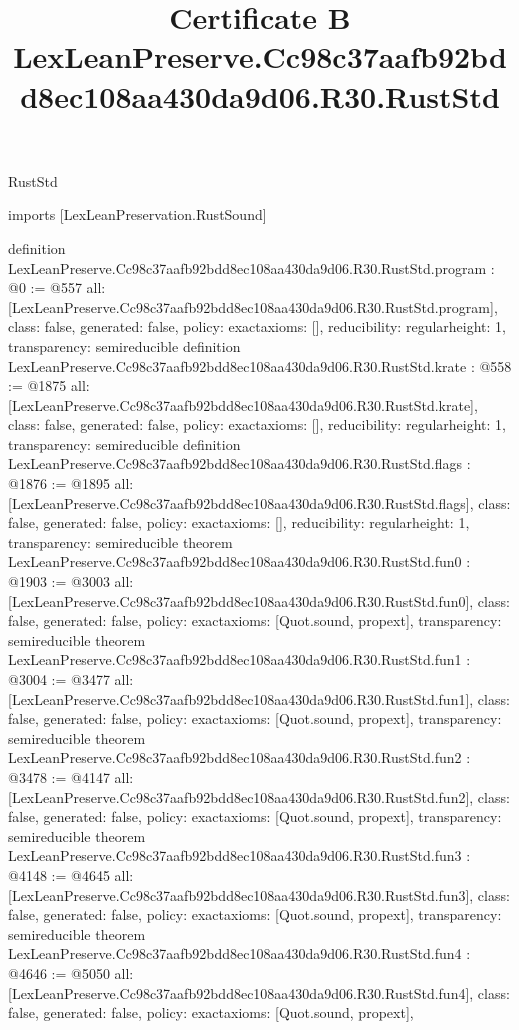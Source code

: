 \begin{lexlean}{RustStd}
\title{Certificate B LexLeanPreserve.Cc98c37aafb92bdd8ec108aa430da9d06.R30.RustStd}
\begin{coremodule}
imports [LexLeanPreservation.RustSound]

definition LexLeanPreserve.Cc98c37aafb92bdd8ec108aa430da9d06.R30.RustStd.program : @0 := @557 {
  all: [LexLeanPreserve.Cc98c37aafb92bdd8ec108aa430da9d06.R30.RustStd.program],
  class: false,
  generated: false,
  policy: exact{axioms: []},
  reducibility: regular{height: 1},
  transparency: semireducible
}
definition LexLeanPreserve.Cc98c37aafb92bdd8ec108aa430da9d06.R30.RustStd.krate : @558 := @1875 {
  all: [LexLeanPreserve.Cc98c37aafb92bdd8ec108aa430da9d06.R30.RustStd.krate],
  class: false,
  generated: false,
  policy: exact{axioms: []},
  reducibility: regular{height: 1},
  transparency: semireducible
}
definition LexLeanPreserve.Cc98c37aafb92bdd8ec108aa430da9d06.R30.RustStd.flags : @1876 := @1895 {
  all: [LexLeanPreserve.Cc98c37aafb92bdd8ec108aa430da9d06.R30.RustStd.flags],
  class: false,
  generated: false,
  policy: exact{axioms: []},
  reducibility: regular{height: 1},
  transparency: semireducible
}
theorem LexLeanPreserve.Cc98c37aafb92bdd8ec108aa430da9d06.R30.RustStd.fun0 : @1903 := @3003 {
  all: [LexLeanPreserve.Cc98c37aafb92bdd8ec108aa430da9d06.R30.RustStd.fun0],
  class: false,
  generated: false,
  policy: exact{axioms: [Quot.sound, propext]},
  transparency: semireducible
}
theorem LexLeanPreserve.Cc98c37aafb92bdd8ec108aa430da9d06.R30.RustStd.fun1 : @3004 := @3477 {
  all: [LexLeanPreserve.Cc98c37aafb92bdd8ec108aa430da9d06.R30.RustStd.fun1],
  class: false,
  generated: false,
  policy: exact{axioms: [Quot.sound, propext]},
  transparency: semireducible
}
theorem LexLeanPreserve.Cc98c37aafb92bdd8ec108aa430da9d06.R30.RustStd.fun2 : @3478 := @4147 {
  all: [LexLeanPreserve.Cc98c37aafb92bdd8ec108aa430da9d06.R30.RustStd.fun2],
  class: false,
  generated: false,
  policy: exact{axioms: [Quot.sound, propext]},
  transparency: semireducible
}
theorem LexLeanPreserve.Cc98c37aafb92bdd8ec108aa430da9d06.R30.RustStd.fun3 : @4148 := @4645 {
  all: [LexLeanPreserve.Cc98c37aafb92bdd8ec108aa430da9d06.R30.RustStd.fun3],
  class: false,
  generated: false,
  policy: exact{axioms: [Quot.sound, propext]},
  transparency: semireducible
}
theorem LexLeanPreserve.Cc98c37aafb92bdd8ec108aa430da9d06.R30.RustStd.fun4 : @4646 := @5050 {
  all: [LexLeanPreserve.Cc98c37aafb92bdd8ec108aa430da9d06.R30.RustStd.fun4],
  class: false,
  generated: false,
  policy: exact{axioms: [Quot.sound, propext]},
}
\end{coremodule}
\end{lexlean}
